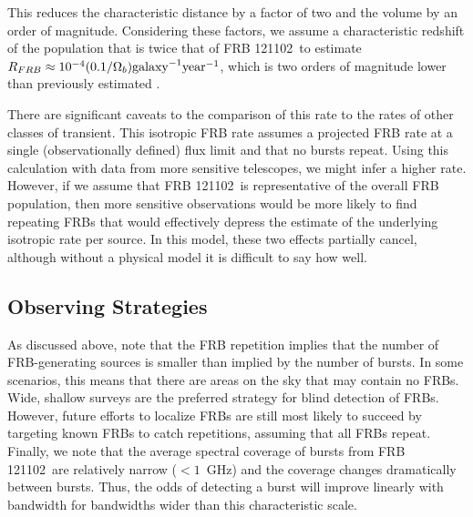 \documentclass[twocolumn]{aastex61}
\newcommand{\frb}{FRB 121102}
\begin{document}
This reduces the characteristic distance by a factor of two and the volume by an order of magnitude. Considering these factors, we assume a characteristic redshift of the population that is twice that of \frb\ to estimate $R_{FRB} \approx 10^{-4} (0.1/\Omega_b) \rm{galaxy}^{-1} \rm{year}^{-1}$, which is two orders of magnitude lower than previously estimated \citep[assuming isotropic radiation;]{2013Sci...341...53T}.

There are significant caveats to the comparison of this rate to the rates of other classes of transient. This isotropic FRB rate assumes a projected FRB rate at a single (observationally defined) flux limit and that no bursts repeat. Using this calculation with data from more sensitive telescopes, we might infer a higher rate. However, if we assume that \frb\ is representative of the overall FRB population, then more sensitive observations would be more likely to find repeating FRBs that would effectively depress the estimate of the underlying isotropic rate per source. In this model, these two effects partially cancel, although without a physical model it is difficult to say how well.

\subsection{Observing Strategies}
As discussed above, \citet{2016MNRAS.458L..89C} note that the FRB repetition implies that the number of FRB-generating sources is smaller than implied by the number of bursts. In some scenarios, this means that there are areas on the sky that may contain no FRBs. Wide, shallow surveys are the preferred strategy for blind detection of FRBs. However, future efforts to localize FRBs are still most likely to succeed by targeting known FRBs to catch repetitions, assuming that all FRBs repeat. Finally, we note that the average spectral coverage of bursts from \frb\ are relatively narrow ($<1$~GHz) and the coverage changes dramatically between bursts. Thus, the odds of detecting a burst will improve linearly with bandwidth for bandwidths wider than this characteristic scale.

\end{document}
